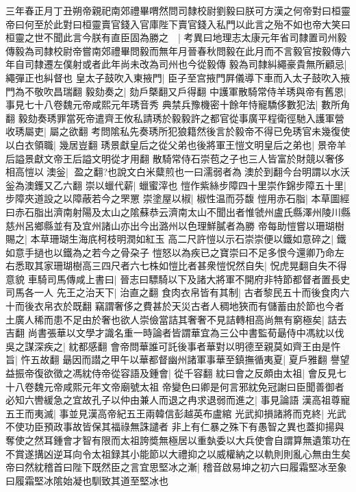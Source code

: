 三年春正月丁丑朔帝親祀南郊禮畢喟然問司隸校尉劉毅曰朕可方漢之何帝對曰桓靈帝曰何至於此對曰桓靈賣官錢入官庫陛下賣官錢入私門以此言之殆不如也帝大笑曰桓靈之世不聞此言今朕有直臣固為勝之　|{
	考異曰地理志太康元年省司隸置司州毅傳毅為司隸校尉帝嘗南郊禮畢問毅而無年月晉春秋問毅在此月而不言毅官按毅傳六年自司隸遷左僕射或者此年尚未改為司州也今從毅傳}
毅為司隸糾繩豪貴無所顧忌|{
	繩彈正也糾督也}
皇太子鼓吹入東掖門|{
	臣子至宫掖門屛儀導下車而入太子鼓吹入掖門為不敬吹昌瑞翻}
毅劾奏之|{
	劾戶槩翻又戶得翻}
中護軍散騎常侍羊琇與帝有舊恩|{
	事見七十八卷魏元帝咸熙元年琇音秀}
典禁兵豫機密十餘年恃寵驕侈數犯法|{
	數所角翻}
毅劾奏琇罪當死帝遣齊王攸私請琇於毅毅許之都官從事廣平程衛徑馳入護軍營收琇屬吏|{
	屬之欲翻}
考問隂私先奏琇所犯狼籍然後言於毅帝不得已免琇官未幾復使以白衣領職|{
	幾居豈翻}
琇景獻皇后之從父弟也後將軍王愷文明皇后之弟也|{
	景帝羊后謚景獻文帝王后謚文明從才用翻}
散騎常侍石崇苞之子也三人皆富於財競以奢侈相高愷以澳釡|{
	盈之翻?也說文白米糵煎也一曰濡弱者為澳於到翻今台明謂以水沃釡為澳鑊又乙六翻}
崇以蠟代薪|{
	蠟蜜滓也}
愷作紫絲步障四十里崇作錦步障五十里|{
	步障夾道設之以障蔽若今之罘罳}
崇塗屋以椒|{
	椒性温而芬馥}
愷用赤石脂|{
	本草圖經曰赤石脂出濟南射陽及太山之隂蘇恭云濟南太山不聞出者惟虢州盧氏縣澤州陵川縣慈州呂鄉縣並有及宜州諸山亦出今出潞州以色理鮮膩者為勝}
帝每助愷嘗以珊瑚樹賜之|{
	本草珊瑚生海㡳柯枝明潤如紅玉}
高二尺許愷以示石崇崇便以鐵如意碎之|{
	鐵如意手撾也以鐵為之若今之骨朶子}
愷怒以為疾已之寶崇曰不足多恨今還卿乃命左右悉取其家珊瑚樹高三四尺者六七株如愷比者甚衆愷怳然自失|{
	怳虎晃翻自失不得意貌}
車騎司馬傳咸上書曰|{
	晉志曰驃騎以下及諸大將軍不開府非特節都督者置長史司馬各一人}
先王之治天下|{
	治直之翻}
食肉衣帛皆有其制|{
	古者黎民五十而後食肉六十而後衣帛衣於既翻}
竊謂奢侈之費甚於天災古者人稠地狹而有儲蓄由於節也今者土廣人稀而患不足由於奢也欲人崇儉當詰其奢奢不見詰轉相高尚無有窮極矣|{
	詰去吉翻}
尚書張華以文學才識名重一時論者皆謂華宜為三公中書監荀朂侍中馮紞以伐吳之謀深疾之|{
	紞都感翻}
會帝問華誰可託後事者華對以明德至親莫如齊王由是忤旨|{
	忤五故翻}
朂因而譛之甲午以華都督幽州諸軍事華至鎮撫循夷夏|{
	夏戶雅翻}
譽望益振帝復欲徵之馮紞侍帝從容語及鍾會|{
	從千容翻}
紞曰會之反頗由太祖|{
	會反見七十八卷魏元帝咸熙元年文帝廟號太祖}
帝變色曰卿是何言邪紞免冠謝曰臣聞善御者必知六轡緩急之宜故孔子以仲由兼人而退之冉求退弱而進之|{
	事見論語}
漢高祖尊寵五王而夷滅|{
	事並見漢高帝紀五王兩韓信彭越英布盧綰}
光武抑損諸將而克終|{
	光武不使功臣預政事故皆保其福祿無誅譴者}
非上有仁暴之殊下有愚智之異也蓋抑揚與奪使之然耳鍾會才智有限而太祖誇奬無極居以重埶委以大兵使會自謂算無遺策功在不賞遂搆凶逆耳向令太祖録其小能節以大禮抑之以威權納之以軌則則亂心無由生矣帝曰然紞稽首曰陛下既然臣之言宜思堅冰之漸|{
	稽音啟易坤之初六曰履霜堅冰至象曰履霜堅冰隂始凝也馴致其道至堅冰也}
